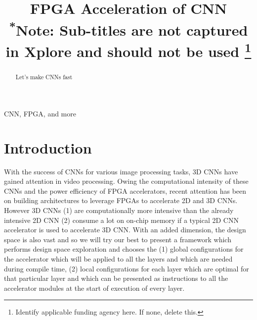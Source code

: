 \documentclass[conference]{IEEEtran}
\begin{document}
\title{FPGA Acceleration of CNN\\
{\footnotesize \textsuperscript{*}Note: Sub-titles are not captured in Xplore and
should not be used}
\thanks{Identify applicable funding agency here. If none, delete this.}
}

\author{
\and
{}
\and
{}
}

\maketitle

\begin{abstract}
Let's make CNNs fast
\end{abstract}

\begin{IEEEkeywords}
CNN, FPGA, and more
\end{IEEEkeywords}

\section{Introduction}
With the success of CNNs for various image processing tasks, 3D CNNs have gained attention in video processing. Owing the computational intensity of these CNNs and the power efficiency of FPGA accelerators, recent attention has been on building architectures to leverage FPGAs to accelerate 2D and 3D CNNs. However 3D CNNs  (1) are computationally more intensive than the already intensive 2D CNN (2) consume a lot on on-chip memory if a typical 2D CNN accelerator is used to accelerate 3D CNN. With an added dimension, the design space is also vast and so we will try our best to present a framework which performs design space exploration and chooses the (1) global configurations for the accelerator which will be applied to all the layers and which are needed during compile time, (2) local configurations for each layer which are optimal for that particular layer and which can be presented as instructions to all the accelerator modules at the start of execution of every layer. 
\end{document}
